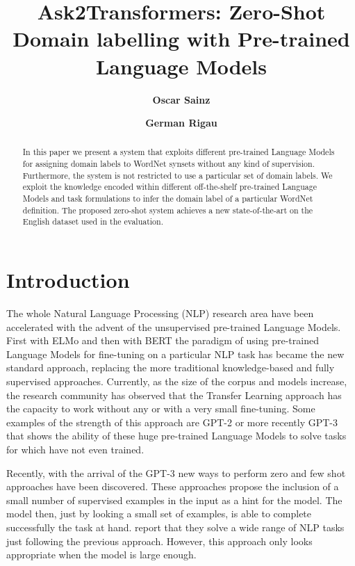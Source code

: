 \documentclass[11pt]{article}
\title{Ask2Transformers: Zero-Shot Domain labelling with Pre-trained Language Models}
\author{\textbf{Oscar Sainz}}
\author{\textbf{German Rigau}}
\affil{HiTZ Center - Ixa Group, \\
  University of the Basque Country (UPV/EHU)\\
  {\tt \{oscar.sainz, german.rigau\}@ehu.eus}}
\date{}
\begin{document}
\maketitle
\begin{abstract}
  In this paper we present a system that exploits different pre-trained Language Models for assigning domain labels to WordNet synsets without any kind of supervision. Furthermore, the system is not restricted to use a particular set of domain labels. We exploit the knowledge encoded within different off-the-shelf pre-trained Language Models and task formulations to infer the domain label of a particular WordNet definition. The proposed zero-shot system achieves a new state-of-the-art on the English dataset used in the evaluation.
\end{abstract}

\section{Introduction}

The whole Natural Language Processing (NLP) research area have been accelerated with the advent of the unsupervised pre-trained Language Models. First with ELMo \cite{elmo} and then with BERT \cite{bert} the paradigm of using pre-trained Language Models for fine-tuning on a particular NLP task has became the new standard approach, replacing the more traditional knowledge-based and fully supervised approaches. Currently, as the size of the corpus and models increase, the research community has observed that the Transfer Learning approach has the capacity to work without any or with a very small fine-tuning. Some examples of the strength of this approach are GPT-2 \cite{gpt-2} or more recently GPT-3 \cite{gpt-3} that shows the ability of these huge pre-trained Language Models to solve tasks for which have not even trained.



Recently, with the arrival of the GPT-3 new ways to perform zero and few shot approaches have been discovered. These approaches propose the inclusion of a small number of supervised examples in the input as a hint for the model. The model then, just by looking a small set of examples, is able to complete successfully the task at hand. \citet{gpt-3} report that they solve a wide range of NLP tasks just following the previous approach. However, this approach only looks appropriate when the model is large enough.
\end{document}
